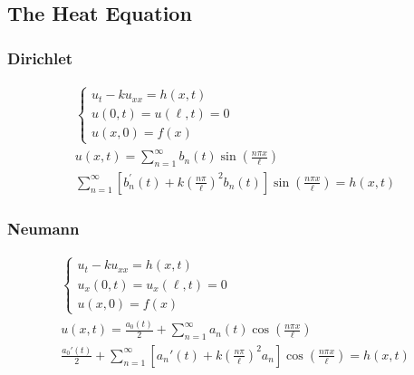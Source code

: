 \documentclass{article}
\begin{document}
\subsection{The Heat Equation}
\begin{minipage}{0.5\textwidth}
\subsubsection*{Dirichlet}
\begin{gather*}
\begin{cases}
u_{t} - ku_{xx} = h(x,t)\\
u(0,t) = u(\ell,t) = 0\\
u(x,0) = f(x)
\end{cases}\\
u(x,t) = \sum_{n=1}^{\infty}b_{n}(t)\sin{\left(\frac{n\pi x}{\ell}\right)}\\
\sum_{n=1}^{\infty}\left[b_{n}^{'}(t)+k\left(\frac{n\pi}{\ell}\right)^{2}b_{n}(t)\right]\sin{\left(\frac{n\pi x}{\ell}\right)} = h(x,t)
\end{gather*}
\end{minipage}
\begin{minipage}{0.5\textwidth}
\subsubsection*{Neumann}
\begin{gather*}
\begin{cases}
u_{t} - ku_{xx} = h(x,t)\\
u_{x}(0,t) = u_{x}(\ell,t) = 0\\
u(x,0) = f(x)
\end{cases}\\
u(x,t) = \frac{a_{0}(t)}{2} + \sum_{n=1}^{\infty}a_{n}(t)\cos{\left(\frac{n\pi x}{\ell}\right)}\\
\frac{a_{0}'(t)}{2} + \sum_{n=1}^{\infty}\left[a_{n}'(t) + k\left(\frac{n\pi}{\ell}\right)^{2}a_{n}\right]\cos{\left(\frac{n\pi x}{\ell}\right)} = h(x,t)
\end{gather*}
\end{minipage}
\end{document}
